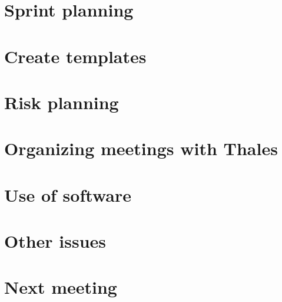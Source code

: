 \documentclass[a4paper,12pt]{article}
\begin{document}
\section{Sprint planning}
\section{Create templates}
\section{Risk planning}
\section{Organizing meetings with Thales}
\section{Use of software}
\section{Other issues}
\section{Next meeting}
\end{document}
